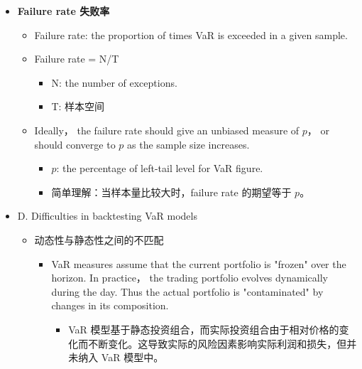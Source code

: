 \begin{itemize}
\begin{itemize}
\begin{itemize}
        \item 如果有太少的例外值，说明 VaR 计算高了，VaR 模型高估了风险，导致金融机构配置更多的资本金，对金融机构会造成资源的浪费。
    \end{itemize}
        \item 也就是说太多的例外值和太少的例外值都不好，要么会带来惩罚，要么会导致资源浪费。所以，要有合适的例外值，也就是 VaR 要准确。
        \end{itemize}
    \item  \textbf{Failure rate 失败率}
        \begin{itemize}
        \item Failure rate: the proportion of times VaR is exceeded in a given sample. 
        \item Failure rate = N/T
            \begin{itemize}
            \item N: the number of exceptions.
            \item T: 样本空间
            \end{itemize}
        \item Ideally， the failure rate should give an unbiased measure of \( p \)， or should converge to \( p \) as the sample size increases.
             \begin{itemize}
             \item \( p \): the percentage of left-tail level for VaR figure. 
             \item 简单理解：当样本量比较大时，failure rate 的期望等于 \( p \)。
            \end{itemize}
        \end{itemize}
    \item  {D. Difficulties in backtesting VaR models}
        \begin{itemize}
        \item 动态性与静态性之间的不匹配
            \begin{itemize}
            \item VaR measures assume that the current portfolio is "frozen" over the horizon. In practice， the trading portfolio evolves dynamically during the day. Thus the actual portfolio is "contaminated" by changes in its composition.
                \begin{itemize}
                \item VaR 模型基于静态投资组合，而实际投资组合由于相对价格的变化而不断变化。这导致实际的风险因素影响实际利润和损失，但并未纳入 VaR 模型中。

\end{itemize}
\end{itemize}
\end{itemize}
\end{itemize}

